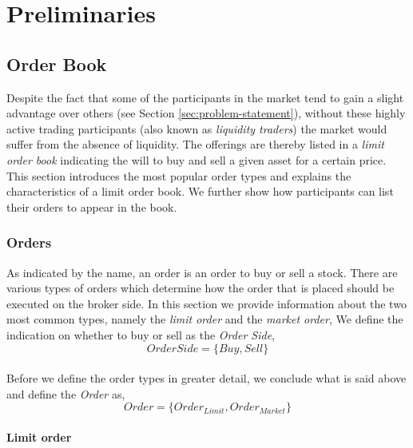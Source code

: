 \chapter{Preliminaries}
\label{chap:preliminaries}

\section{Order Book}

Despite the fact that some of the participants in the market tend to gain a slight advantage over others (see Section \ref{sec:problem-statement}), without these highly active trading participants (also known as \textit{liquidity traders}) the market would suffer from the absence of liquidity.
The offerings are thereby listed in a \textit{limit order book} indicating the will to buy and sell a given asset for a certain price.
This section introduces the most popular order types and explains the characteristics of a limit order book.
We further show how participants can list their orders to appear in the book.

\subsection{Orders}
\label{sec:orders}

As indicated by the name, an order is an order to buy or sell a stock.
There are various types of orders which determine how the order that is placed should be executed on the broker side.
In this section we provide information about the two most common types, namely the \textit{limit order} and the \textit{market order},
We define the indication on whether to buy or sell as the \textit{Order Side},
\begin{equation}\label{eq:order-side}
    OrderSide=\{Buy, Sell\}
\end{equation}
\\
Before we define the order types in greater detail, we conclude what is said above and define the \textit{Order} as,
\begin{equation}\label{eq:order}
Order=\{Order_{Limit}, Order_{Market}\}
\end{equation}

\subsubsection{Limit order}
\label{sec:limit-order}

